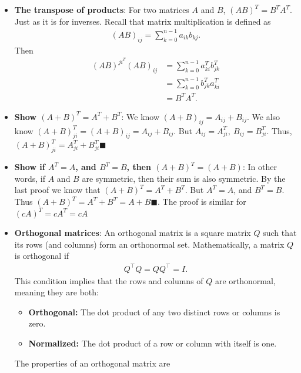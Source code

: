 \documentclass{report}
\begin{document}
\begin{itemize}
        \item \textbf{The transpose of products}: For two matrices $A$ and $B$, $(AB)^{T} = B^{T}A^{T}$. Just as it is for inverses. Recall that matrix multiplication is defined as 
            \begin{align*}
                (AB)_{ij} = \sum_{k=0}^{n-1}a_{ik}b_{kj}
            .\end{align*}
            Then
            \begin{align*}
                (AB)^{ji}^{T} (AB)_{ij} &= \sum_{k=0}^{n-1}a_{ki}^{T}b_{jk}^{T} \\
                                        &=\sum_{k=0}^{n-1}b_{jk}^{T}a_{ki}^{T} \\
                                        &=B^{T}A^{T}
            .\end{align*}
        \item \textbf{Show $(A+B)^{T} = A^{T} + B^{T}$}: We know $(A+B)_{ij} = A_{ij} + B_{ij}$. We also know $(A+B)^{T}_{ji} = (A+B)_{ij} = A_{ij} + B_{ij}$. But $A_{ij} = A^{T}_{ji},\ B_{ij} = B^{T}_{ji}$. Thus, $(A+B)_{ji}^{T} = A^{T}_{ji} + B^{T}_{ji} \blacksquare$
        \item \textbf{Show if $A^{T} = A$, and $B^{T} = B$, then $(A+B)^{T} = (A+B)$}: In other words, if $A$ and $B$ are symmetric, then their sum is also symmetric. By the last proof we know that $(A+B)^{T} = A^{T} + B^{T}$. But $A^{T} = A$, and $B^{T} = B$. Thus $(A+B)^{T} = A^{T} + B^{T} = A + B \blacksquare$. The proof is similar for $(cA)^{T} = cA^{T} = cA$
        \item \textbf{Orthogonal matrices}:  An orthogonal matrix is a square matrix $Q$ such that its rows (and columns) form an orthonormal set. Mathematically, a matrix $Q$ is orthogonal if
            \begin{align*}
                Q^{\top} Q = QQ^{\top} = I
            .\end{align*}
            This condition implies that the rows and columns of $Q$ are orthonormal, meaning they are both:
            \begin{itemize}
                \item \textbf{Orthogonal:} The dot product of any two distinct rows or columns is zero.
                \item \textbf{Normalized:} The dot product of a row or column with itself is one.
            \end{itemize}
            \bigbreak \noindent 
            The properties of an orthogonal matrix are
            \begin{itemize}

\end{itemize}
\end{itemize}
\end{document}
